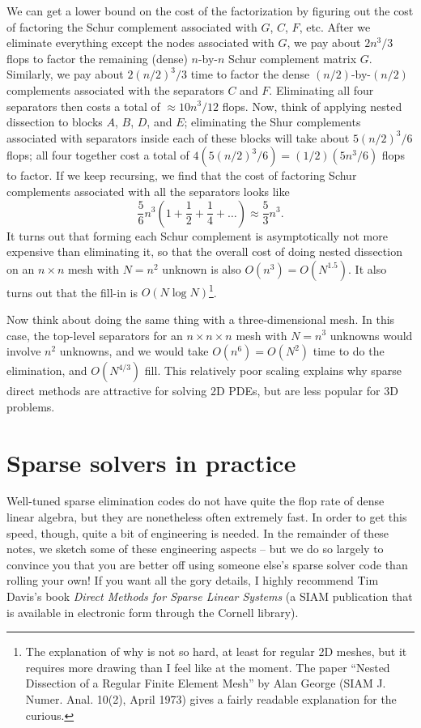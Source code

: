 \documentclass[12pt, leqno]{article} %
\begin{document}
We can get a lower bound on the cost of the factorization by figuring
out the cost of factoring the Schur complement associated with $G$,
$C$, $F$, etc.  After we eliminate everything except the nodes
associated with $G$, we pay about $2n^3/3$ flops to factor the
remaining (dense) $n$-by-$n$ Schur complement matrix $G$.  Similarly,
we pay about $2(n/2)^3/3$ time to factor the dense $(n/2)$-by-$(n/2)$
complements associated with the separators $C$ and $F$.  Eliminating
all four separators then costs a total of $\approx 10n^3/12$ flops.
Now, think of applying nested dissection to blocks $A$, $B$, $D$, and
$E$; eliminating the Shur complements associated with separators
inside each of these blocks will take about $5(n/2)^3/6$ flops; all
four together cost a total of $4 ( 5(n/2)^3/6 )= (1/2)
(5n^3/6)$ flops to factor.  If we keep recursing, we find that the
cost of factoring Schur complements associated with all the separators
looks like
\[
  \frac{5}{6} n^3 \left( 1 + \frac{1}{2} + \frac{1}{4} + \ldots \right)
  \approx \frac{5}{3}n^3.
\]
It turns out that forming each Schur complement is asymptotically not
more expensive than eliminating it, so that the overall cost of doing
nested dissection on an $n \times n$ mesh with $N = n^2$ unknown is also
$O(n^3) = O(N^{1.5})$.  It also turns out that the fill-in is
$O(N \log N)$\footnote{
  The explanation of why is not so hard, at least for regular 2D meshes,
  but it requires more drawing than I feel like at the moment.  The paper
  ``Nested Dissection of a Regular Finite Element Mesh'' by Alan George
  (SIAM J. Numer. Anal. 10(2), April 1973) gives a fairly readable explanation
  for the curious.
}.

Now think about doing the same thing with a three-dimensional mesh.
In this case, the top-level separators for an $n \times n \times n$ mesh
with $N = n^3$ unknowns would involve $n^2$ unknowns, and we would take
$O(n^6) = O(N^2)$ time to do the elimination, and $O(N^{4/3})$ fill.
This relatively poor scaling explains why sparse direct methods are attractive
for solving 2D PDEs, but are less popular for 3D problems.

\section{Sparse solvers in practice}

Well-tuned sparse elimination codes do not have quite the flop rate of
dense linear algebra, but they are nonetheless often extremely fast.
In order to get this speed, though, quite a bit of engineering is
needed.  In the remainder of these notes, we sketch some of these
engineering aspects -- but we do so largely to convince you that you
are better off using someone else's sparse solver code than rolling
your own!  If you want all the gory details, I highly recommend Tim
Davis's book {\em Direct Methods for Sparse Linear Systems} (a SIAM
publication that is available in electronic form through the Cornell
library).
\end{document}
